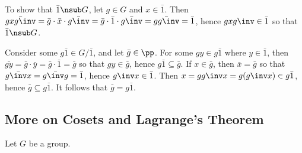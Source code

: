 \begin{problems}
\begin{sol}
        To show that $\bar 1 \nsub G$, let $g \in G$ and $x \in \bar 1$. Then $\bar{gxg\inv} = \bar g \cdot \bar x \cdot \bar{g\inv} = \bar g \cdot \bar 1 \cdot \bar{g\inv} = \bar{gg\inv} = \bar 1$, hence $gxg\inv \in \bar 1$ so that $\bar 1 \nsub G$.

        Consider some $g\bar 1 \in G/\bar 1$, and let $\bar g \in \pp$. For some $gy \in g\bar 1$ where $y \in \bar 1$, then $\bar{gy} = \bar g \cdot \bar y = \bar g \cdot \bar 1 = \bar g$ so that $gy \in \bar g$, hence $g \bar 1 \subseteq \bar g$. If $x \in \bar g$, then $\bar x = \bar g$ so that $\bar{g\inv x} = \bar{g\inv g} = \bar 1$, hence $g\inv x \in \bar 1$. Then $x = gg\inv x = g(g\inv x) \in g\bar 1$, hence $\bar g \subseteq g\bar 1$. It follows that $\bar g = g\bar 1$.
    \end{sol}
\end{problems}

\newpage

\subsection{More on Cosets and Lagrange's Theorem}

Let $G$ be a group.

